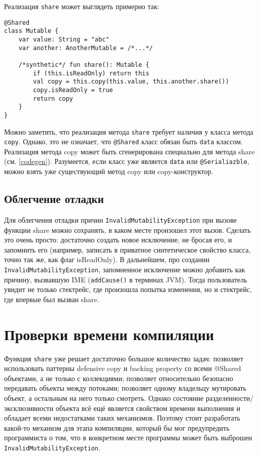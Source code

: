 \documentclass[specification,annotation,times]{itmo-student-thesis}
\begin{document}
Реализация \texttt{share} может выглядеть примерно так:

\begin{lstlisting}[float=h!,caption={Реализация share}]
@Shared
class Mutable {
	var value: String = "abc"
	var another: AnotherMutable = /*...*/
	
	/*synthetic*/ fun share(): Mutable {
		if (this.isReadOnly) return this
		val copy = this.copy(this.value, this.another.share())
		copy.isReadOnly = true
		return copy
	}
}
\end{lstlisting}

Можно заметить, что реализация метода \texttt{share} требует наличия у класса метода \texttt{copy}.
Однако, это не означает, что \texttt{@Shared} класс обязан быть \texttt{data} классом.
Реализация метода copy может быть сгенерирована специально для метода share (см. \ref{codegen}).
Разумеется, если класс уже является \texttt{data} или \texttt{@Serialiazble}, можно взять уже существующий метод copy или copy-конструктор.

\subsection{Облегчение отладки}

Для облегчения отладки причин \texttt{InvalidMutabilityException} при вызове функции share можно сохранять, в каком месте произошел этот вызов.
Сделать это очень просто: достаточно создать новое исключение, не бросая его, и запомнить его (например, записать в приватное синтетическое свойство класса, точно так же, как флаг isReadOnly).
В дальнейшем, про создании \texttt{InvalidMutabilityException}, запомненное исключение можно добавить как причину, вызвавшую IME (\texttt{addCause()} в терминах JVM).
Тогда пользователь увидит не только стектрейс, где произошла попытка изменения, но и стектрейс, где впервые был вызван share.

\section{Проверки времени компиляции}\label{compile_checks}

Функция \texttt{share} уже решает достаточно большое количество задач: позволяет использовать паттерны defensive copy и backing property со всеми @Shared объектами, а не только с коллекциями; позволяет относительно безопасно передавать объекты между потоками; позволяет одному владельцу мутировать объект, а остальным на него только смотреть.
Однако состояние разделенности/эксклюзивности объекта всё ещё является свойством времени выполнения и обладает всеми недостатками таких механизмов. 
Поэтому стоит разработать какой-то механизм для этапа компиляции, который бы мог предупредить программиста о том, что в конкретном месте программы может быть выброшен \texttt{InvalidMutabilityException}.
\end{document}
